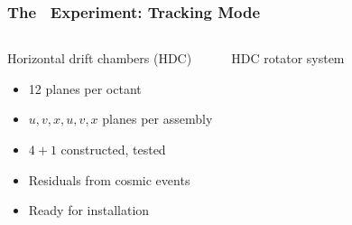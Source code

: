 \begin{frame}
 \frametitle{The \Qweak\ Experiment: Tracking Mode}
 \begin{columns}[T]
   \begin{block}{Horizontal drift chambers (HDC)}
    \begin{itemize}
     \item 12 planes per octant
     \item $u,v,x,u,v,x$ planes per assembly
    \end{itemize}
    \centerline{}
    \begin{itemize}
     \item $4 + 1$ constructed, tested
     \item Residuals from cosmic events
     \item Ready for installation
    \end{itemize}
   \end{block}
   \begin{block}{HDC rotator system}
    \begin{center}
    \end{center}
   \end{block}
 \end{columns}
\end{frame}
